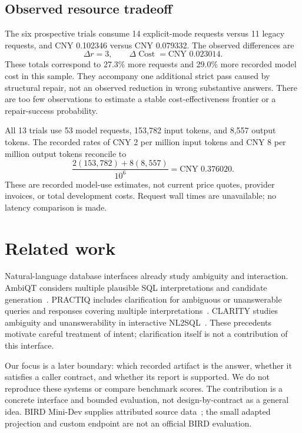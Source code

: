 \documentclass{article}
\begin{document}
\subsection{Observed resource tradeoff}
The six prospective trials consume 14 explicit-mode requests versus 11 legacy requests, and CNY 0.102346 versus CNY 0.079332. The observed differences are
\begin{equation}
\Delta r=3,\qquad \Delta\operatorname{Cost}=\text{CNY }0.023014.
\label{eq:observedcost}
\end{equation}
These totals correspond to 27.3\% more requests and 29.0\% more recorded model cost in this sample. They accompany one additional strict pass caused by structural repair, not an observed reduction in wrong substantive answers. There are too few observations to estimate a stable cost-effectiveness frontier or a repair-success probability.

All 13 trials use 53 model requests, 153,782 input tokens, and 8,557 output tokens. The recorded rates of CNY 2 per million input tokens and CNY 8 per million output tokens reconcile to
\begin{equation}
\frac{2(153{,}782)+8(8{,}557)}{10^6}=\text{CNY }0.376020.
\end{equation}
These are recorded model-use estimates, not current price quotes, provider invoices, or total development costs. Request wall times are unavailable; no latency comparison is made.

\section{Related work}
Natural-language database interfaces already study ambiguity and interaction. AmbiQT considers multiple plausible SQL interpretations and candidate generation~\citep{ambi}. PRACTIQ includes clarification for ambiguous or unanswerable queries and responses covering multiple interpretations~\citep{practiq}. CLARITY studies ambiguity and unanswerability in interactive NL2SQL~\citep{clarity}. These precedents motivate careful treatment of intent; clarification itself is not a contribution of this interface.

Our focus is a later boundary: which recorded artifact is the answer, whether it satisfies a caller contract, and whether its report is supported. We do not reproduce these systems or compare benchmark scores. The contribution is a concrete interface and bounded evaluation, not design-by-contract as a general idea. BIRD Mini-Dev supplies attributed source data~\citep{birdminidev}; the small adapted projection and custom endpoint are not an official BIRD evaluation.
\end{document}
